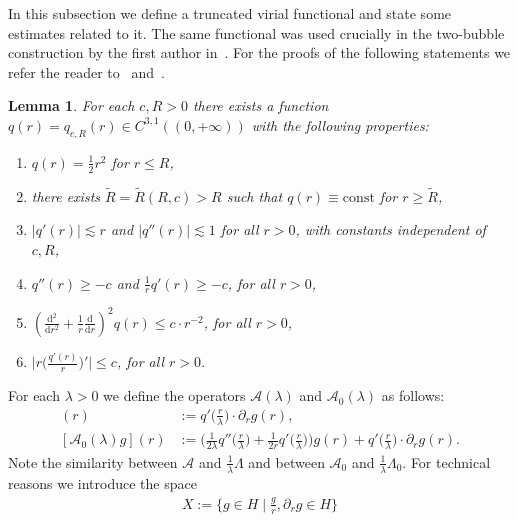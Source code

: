 \documentclass[10pt,reqno]{amsart}
\newcommand{\tx}[1]{\mathrm{#1}}
\newcommand{\vd}{\mathrm{d}}
\newcommand{\A}{\mathcal{A}}
\newcommand{\la}{\lambda}
\newcommand{\La}{\Lambda}
\newcommand{\p}{\partial}
\newcommand{\ti}{\widetilde}
\newcommand{\EQ}[1]{\begin{equation}\begin{split} #1 \end{split}\end{equation}}
\numberwithin{equation}{section}
\newtheorem{lem}[thm]{Lemma}
\theoremstyle{remark}
\newcommand{\dd}[1]{\frac{\ud}{\ud{#1}}}
\newcommand{\ud}{\mathrm{d}}
\newcommand{\0}{\emptyset}
\begin{document}
In this subsection we define a truncated virial functional and state some estimates related to it. The same functional was used crucially in the two-bubble construction by the first author in~\cite{JJ-AJM}.
For the proofs of the following statements we refer the reader to~\cite[Lemma 4.6]{JJ-AJM} and~\cite[Lemma 5.5]{JJ-AJM}. 

\begin{lem} \emph{\cite[Lemma 4.6]{JJ-AJM}}
  \label{lem:fun-q}
  For each $c, R > 0$ there exists a function $q(r) = q_{c, R}(r) \in C^{3,1}((0, +\infty))$ with the following properties:
  \begin{enumerate}[label=(P\arabic*)]
    \item $q(r) = \frac{1}{2} r^2$ for $r \leq R$, \label{enum:approx-q}
    \item there exists $\ti R = \ti R(R, c)> R$ such that $q(r) \equiv \tx{const}$ for $r \geq \ti R$, \label{enum:support-q}
    \item $|q'(r)| \lesssim r$ and $|q''(r)| \lesssim 1$ for all $r > 0$, with constants independent of $c, R$, \label{enum:gradlap-q}
    \item $q''(r) \geq -c$ and $\frac 1r q'(r) \geq -c$, for all $r > 0$, \label{enum:convex-ym}
    \item $(\frac{\vd^2}{\vd r^2} + \frac 1r \dd r)^2 q(r) \leq c\cdot r^{-2}$, for all $r > 0$, \label{enum:bilapl-ym}
    \item $\big|r\big(\frac{q'(r)}{r}\big)'\big| \leq c$, for all $r > 0$. \label{enum:multip-petit-ym}
  \end{enumerate}
\end{lem}
For each $\lambda > 0$ we define the operators $\A(\lambda)$ and $\A_0(\lambda)$ as follows:
\begin{align}
  [\A(\lambda)g](r) &:= q'\big(\frac{r}{\lambda}\big)\cdot \p_r g(r), \label{eq:opA-wm} \\
  [\A_0(\lambda)g](r) &:= \big(\frac{1}{2\lambda}q''\big(\frac{r}{\lambda}\big) + \frac{1}{2r}q'\big(\frac{r}{\lambda}\big)\big)g(r) + q'\big(\frac{r}{\lambda}\big)\cdot\p_r g(r). \label{eq:opA0-wm}
\end{align}
Note the similarity between $\A$ and $\frac{1}{\la} \La$ and between $\A_0$ and $\frac{1}{\la} \La_0$. 
For technical reasons we introduce the space 
\EQ{
X:= \{ g \in H \mid \frac{g}{r}, \p_r g \in H\}
}
\end{document}
